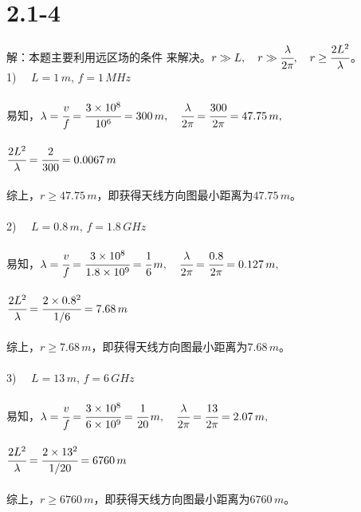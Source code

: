 \documentclass[a4paper,11pt]{article}
\begin{document}
\section{2.1-4}
解：本题主要利用远区场的条件 来解决。$r\gg L,\quad r\gg\cfrac{\lambda}{2\pi},\quad r\geq\cfrac{2L^2}{\lambda}$。\\
1) $\quad L=1\,m,\,f=1\,MHz$\\
\\
易知，$\lambda=\cfrac{v}{f}=\cfrac{3\times 10^8}{10^6}=300\,m,\quad\cfrac{\lambda}{2\pi}=\cfrac{300}{2\pi}=47.75\,m,$ \\
\\
$\cfrac{2L^2}{\lambda}=\cfrac{2}{300}=0.0067\,m$\\
\\
综上，$r\geq 47.75\,m$，即获得天线方向图最小距离为$47.75\,m$。\\
\\
2) $\quad L=0.8\,m,\,f=1.8\,GHz$\\
\\
易知，$\lambda=\cfrac{v}{f}=\cfrac{3\times 10^8}{1.8\times 10^9}=\cfrac{1}{6}\,m,\quad\cfrac{\lambda}{2\pi}=\cfrac{0.8}{2\pi}=0.127\,m,$ \\
\\
$\cfrac{2L^2}{\lambda}=\cfrac{2\times 0.8^2}{1/6}=7.68\,m$\\
\\
综上，$r\geq 7.68\,m$，即获得天线方向图最小距离为$7.68\,m$。\\
\\
3) $\quad L=13\,m,\,f=6\,GHz$\\
\\
易知，$\lambda=\cfrac{v}{f}=\cfrac{3\times 10^8}{6\times 10^9}=\cfrac{1}{20}\,m,\quad\cfrac{\lambda}{2\pi}=\cfrac{13}{2\pi}=2.07\,m,$ \\
\\
$\cfrac{2L^2}{\lambda}=\cfrac{2\times 13^2}{1/20}=6760\,m$\\
\\
综上，$r\geq 6760\,m$，即获得天线方向图最小距离为$6760\,m$。\\
\end{document}
